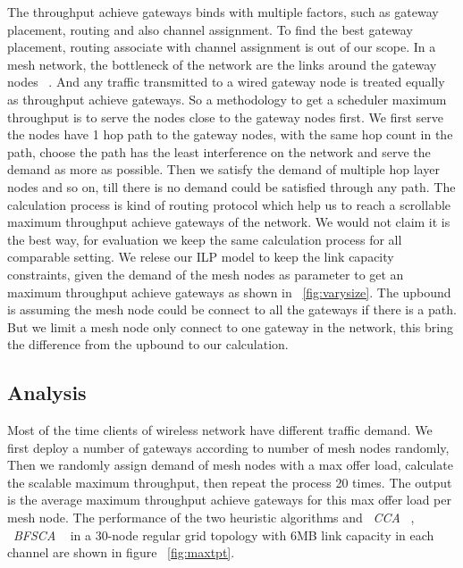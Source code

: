The throughput achieve gateways binds with multiple factors, such as gateway placement, routing and also channel assignment.
To find the best gateway placement, routing associate with channel assignment is out of our scope. 
In a mesh network, the bottleneck of the network are the links around the gateway nodes ~\cite{robinson2010deploying}. 
And any traffic transmitted to a wired gateway node is treated equally as throughput achieve gateways. 
So a methodology to get a scheduler maximum throughput is to serve the nodes close to the gateway nodes first.
We first serve the nodes have 1 hop path to the gateway nodes, with the same hop count in the path, choose the path has the least interference on the network and serve the demand as more as possible. 
Then we satisfy the demand of multiple hop layer nodes and so on, till there is no demand could be satisfied through any path.
The calculation process is kind of routing protocol which help us to reach a scrollable maximum throughput achieve gateways of the network. 
We would not claim it is the best way, for evaluation we keep the same calculation process for all comparable setting.
We relese our ILP model to keep the link capacity constraints, given the demand of the mesh nodes as parameter to get an maximum throughput achieve gateways as shown in ~\ref{fig:varysize}. The upbound is assuming the mesh node could be connect to all the gateways if there is a path. But we limit a mesh node only connect to one gateway in the network, this bring the difference from the upbound to our calculation.



\subsection{Analysis}
\label{subsec:analysis}
Most of the time clients of wireless network have different traffic demand. 
We first deploy a number of gateways according to number of mesh nodes randomly, 
   Then we randomly assign demand of mesh nodes with a max offer load,
   calculate the scalable maximum throughput, then repeat the process 20 times.
   The output is the average maximum throughput achieve gateways for this max offer load per mesh node.
   The performance of the two heuristic algorithms and ~\emph{CCA} ~\cite{draves2004routing}, ~\emph{BFSCA}  ~\cite{ramachandran2006interference} in a 30-node regular grid topology with 6MB link capacity in each channel are shown in figure ~\ref{fig:maxtpt}.

